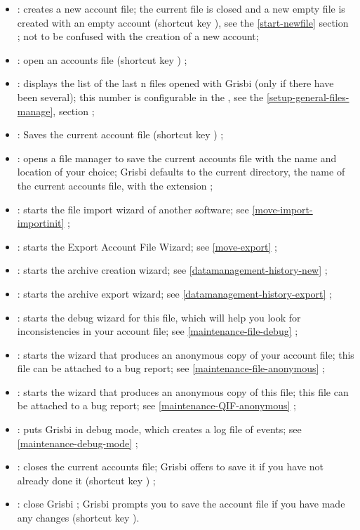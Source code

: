 \begin{itemize}
	\item {} : creates a new account file; the current file is closed and a new empty file is created with an empty account (shortcut key ),  see the \vref{start-newfile} section ; not to be confused with the creation of a new account;
	\item {} : open an accounts file  (shortcut key  ) ;
	\item {} : displays the list of the last n files opened with Grisbi (only if there have been several); this number is configurable in the , see the \vref{setup-general-files-manage},  section ;
	\item {} : Saves the current account file  (shortcut key ) ;
	\item {} : opens a file manager to save the current accounts file with the name and location of your choice; Grisbi defaults to the current directory, the name of the current accounts file, with the  extension ;
	\item {} : starts the file import wizard of another software; see  \vref{move-import-importinit} ;
	\item {} : starts the Export Account File Wizard; see \vref{move-export} ;	
	\item {} : starts the archive creation wizard; see \vref{datamanagement-history-new} ;	
	\item {} : starts the archive export wizard; see \vref{datamanagement-history-export} ;
	\item {} : starts the debug wizard for this file, which will help you look for inconsistencies in your account file; see  \vref{maintenance-file-debug} ;
	\item {} : starts the wizard that produces an anonymous copy of your account file; this file can be attached to a bug report; see \vref{maintenance-file-anonymous} ;	
	\item {} : starts the wizard that produces an anonymous copy of this file; this file can be attached to a bug report; see \vref{maintenance-QIF-anonymous} ;	
	\item {} : puts Grisbi in debug mode, which creates a log file of events; see \vref{maintenance-debug-mode} ; 	
	\item {} : closes the current accounts file; Grisbi offers to save it if you have not already done it (shortcut key ) ;
	\item {} : close Grisbi ; Grisbi prompts you to save the account file if you have made any changes (shortcut key ).
\end{itemize}


